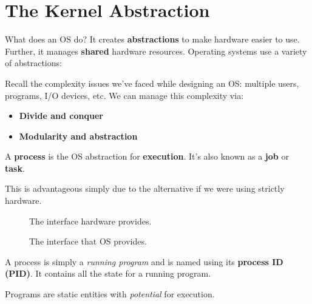 \chapter{The Kernel Abstraction}
What does an OS do? It creates \textbf{abstractions} to make hardware easier to use. Further, it manages \textbf{shared} hardware resources. Operating systems use a variety of abstractions:

\begin{figure}[H]
	\centering
	\label{fig:abstraction}
\end{figure}

Recall the complexity issues we've faced while designing an OS: multiple users, programs, I/O devices, etc. We can manage this complexity via:
\begin{itemize}
	\item \textbf{Divide and conquer} 
	\item \textbf{Modularity and abstraction} 
\end{itemize}

\begin{definition}[Process]
	A \textbf{process} is the OS abstraction for \textbf{execution}. It's also known as a \textbf{job} or \textbf{task}. 
\end{definition}

This is advantageous simply due to the alternative if we were using strictly hardware.

\begin{figure}[H]
	\centering
	\caption{The interface hardware provides.}
	\label{fig:hardwareproc}
\end{figure}

\begin{figure}[H]
	\centering
	\caption{The interface that OS provides.}
	\label{fig:osproc}
\end{figure}

A process is simply a \emph{running program} and is named using its \textbf{process ID (PID)}. It contains all the state for a running program.
\begin{definition}[Program]
	Programs are static entities with \emph{potential} for execution.
\end{definition} 

